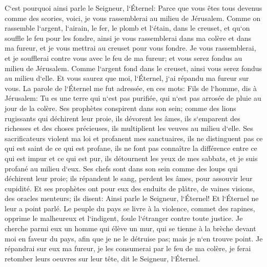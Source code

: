 \verse C`est pourquoi ainsi parle le Seigneur, l`Éternel: Parce que vous êtes tous devenus comme des scories, voici, je vous rassemblerai au milieu de Jérusalem. 
\verse Comme on rassemble l`argent, l`airain, le fer, le plomb et l`étain, dans le creuset, et qu`on souffle le feu pour les fondre, ainsi je vous rassemblerai dans ma colère et dans ma fureur, et je vous mettrai au creuset pour vous fondre. 
\verse Je vous rassemblerai, et je soufflerai contre vous avec le feu de ma fureur; et vous serez fondus au milieu de Jérusalem. 
\verse Comme l`argent fond dans le creuset, ainsi vous serez fondus au milieu d`elle. Et vous saurez que moi, l`Éternel, j`ai répandu ma fureur sur vous. 
\verse La parole de l`Éternel me fut adressée, en ces mots: 
\verse Fils de l`homme, dis à Jérusalem: Tu es une terre qui n`est pas purifiée, qui n`est pas arrosée de pluie au jour de la colère. 
\verse Ses prophètes conspirent dans son sein; comme des lions rugissants qui déchirent leur proie, ils dévorent les âmes, ils s`emparent des richesses et des choses précieuses, ils multiplient les veuves au milieu d`elle. 
\verse Ses sacrificateurs violent ma loi et profanent mes sanctuaires, ils ne distinguent pas ce qui est saint de ce qui est profane, ils ne font pas connaître la différence entre ce qui est impur et ce qui est pur, ils détournent les yeux de mes sabbats, et je suis profané au milieu d`eux. 
\verse Ses chefs sont dans son sein comme des loups qui déchirent leur proie; ils répandent le sang, perdent les âmes, pour assouvir leur cupidité. 
\verse Et ses prophètes ont pour eux des enduits de plâtre, de vaines visions, des oracles menteurs; ils disent: Ainsi parle le Seigneur, l`Éternel! Et l`Éternel ne leur a point parlé. 
\verse Le peuple du pays se livre à la violence, commet des rapines, opprime le malheureux et l`indigent, foule l`étranger contre toute justice. 
\verse Je cherche parmi eux un homme qui élève un mur, qui se tienne à la brèche devant moi en faveur du pays, afin que je ne le détruise pas; mais je n`en trouve point. 
\verse Je répandrai sur eux ma fureur, je les consumerai par le feu de ma colère, je ferai retomber leurs oeuvres sur leur tête, dit le Seigneur, l`Éternel. 

\chapter{}

